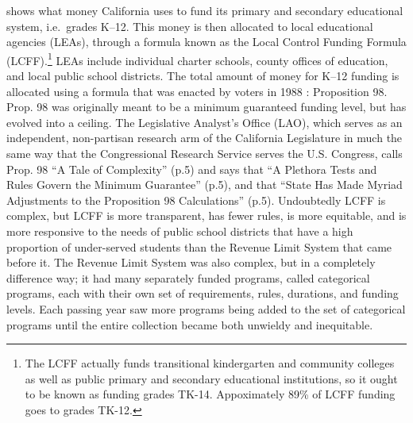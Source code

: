  shows what money California uses to fund its primary and secondary educational system, i.e.~grades K–12. This money is then allocated to local educational agencies (LEAs), through a formula known as the Local Control Funding Formula (LCFF).\footnote{The LCFF actually funds transitional kindergarten and community colleges as well as public primary and secondary educational institutions, so it ought to be known as funding grades TK-14. Appoximately 89\% of LCFF funding goes to grades TK-12.} LEAs include individual charter schools, county offices of education, and local public school districts. The total amount of money for K–12 funding is allocated using a formula that was enacted by voters in 1988 \parencite{LAO2017}: Proposition 98. Prop. 98 was originally meant to be a minimum guaranteed funding level, but has evolved into a ceiling. The Legislative Analyst's Office (LAO), which serves as an independent, non-partisan research arm of the California Legislature in much the same way that the Congressional Research Service serves the U.S. Congress, calls Prop. 98 ``A Tale of Complexity''  (p.5) and says that ``A Plethora Tests and Rules Govern the Minimum Guarantee'' (p.5), and that ``State Has Made Myriad Adjustments to the Proposition 98 Calculations'' (p.5). Undoubtedly LCFF is complex, but LCFF is more transparent, has fewer rules, is more equitable, and is more responsive to the needs of public school districts that have a high proportion of under-served students than the Revenue Limit System that came before it. The Revenue Limit System was also complex, but in a completely difference way; it had many separately funded programs, called categorical programs, each with their own set of requirements, rules, durations, and funding levels. Each passing year saw more programs being added to the set of categorical programs until the entire collection became both unwieldy and inequitable.

